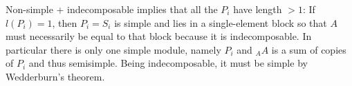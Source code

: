 \documentclass[fontsize=11pt,fleqn,a4paper]{scrartcl}
\begin{document}
\begin{remark}
Non-simple + indecomposable implies that all the $P_i$ have length $>1$: If $l(P_i)=1$, then $P_i=S_i$ is simple and lies in a single-element block so that $A$ must necessarily be equal to that block because it is indecomposable. In particular there is only one simple module, namely $P_i$ and ${_A A}$ is a sum of copies of $P_i$ and thus semisimple. Being indecomposable, it must be simple by Wedderburn's theorem.
\end{remark}
\end{document}
